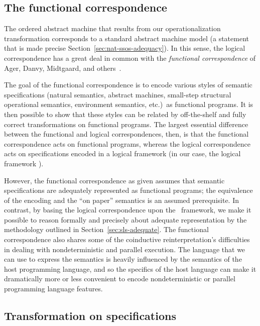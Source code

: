 \subsection*{The functional correspondence}

The ordered abstract machine that results from our operationalization
transformation corresponds to a standard abstract machine model (a
statement that is made precise
Section~\ref{sec:nat-ssos-adequacy}). In this sense, the logical
correspondence has a great deal in common with the {\it functional
  correspondence} of Ager, Danvy, Midtgaard, and
others~\cite{ager03functional,ager04functional,ager05functional,
  danvy08defunctionalized,danvy12interderiving}. 

The goal of the functional correspondence is to encode various styles
of semantic specifications (natural semantics, abstract machines,
small-step structural operational semantics, environment semantics,
etc.)~as functional programs. It is then possible to show that these
styles can be related by off-the-shelf and fully correct
transformations on functional programs. The largest essential
difference between the functional and logical correspondences, then,
is that the functional correspondence acts on functional programs,
whereas the logical correspondence acts on specifications encoded in a
logical framework (in our case, the logical framework \sls).

However, the functional correspondence as given assumes that semantic
specifications are adequately represented as functional programs; the
equivalence of the encoding and the ``on paper'' semantics is an
assumed prerequisite. In contrast, by basing the logical
correspondence upon the \sls~framework, we make it possible to reason
formally and precisely about adequate representation by the
methodology outlined in Section~\ref{sec:sls-adequate}. The functional
correspondence also shares some of the coinductive reinterpretation's
difficulties in dealing with nondeterministic and parallel execution.
The language that we can use to express the semantics is heavily
influenced by the semantics of the host programming language, and so
the specifics of the host language can make it dramatically more or
less convenient to encode nondeterministic or parallel programming
language features.

\subsection*{Transformation on specifications}


